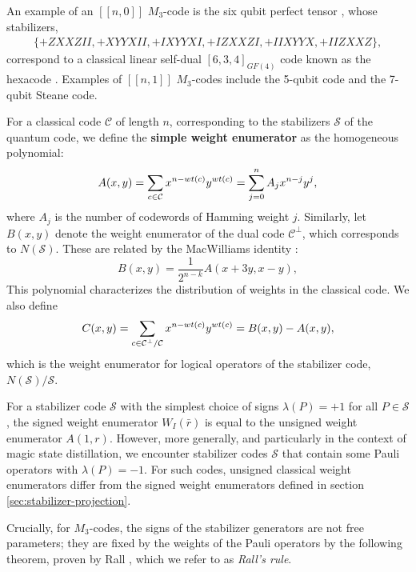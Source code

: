 \documentclass[11pt]{article}
\newcommand{\wt}{{\rm{wt}} }
\begin{document}
An example of an $[[n,0]]$ $M_3$-code is the six qubit perfect tensor \cite{pastawski2015holographic}, whose stabilizers, 
\begin{equation}
    \begin{split}
     \{   +ZXXZII, +XYYXII,  +IXYYXI,  +IZXXZI, +IIXYYX, +IIZXXZ\},
    \end{split}
\end{equation}
correspond to a classical linear self-dual $[6,3,4] _{GF(4)}$ code known as the hexacode \cite{macwilliams1978self}. Examples of $[[n,1]]$ $M_3$-codes include the 5-qubit code and the 7-qubit Steane code.

For a classical code $\mathcal{C}$ of length $n$, corresponding to the stabilizers $\mathcal{S}$ of the quantum code, we define the \textbf{simple weight enumerator} \cite{MacWilliamsSloane5} as the homogeneous polynomial:
\begin{equation}
    A(x,y) = \sum_{c \in \mathcal{C}} x^{n-\wt(c)} y^{\wt(c)} = \sum_{j=0}^n A_j x^{n-j} y^j,
\end{equation}
where $A_j$ is the number of codewords of Hamming weight $j$. Similarly, let $B(x,y)$ denote the weight enumerator of the dual code $\mathcal{C}^\perp$, which corresponds to $N(\mathcal S)$.
These are related by the MacWilliams identity \cite{MacWilliamsSloane5}:
\begin{equation}
    B(x,y) = \frac{1}{2^{n-k}} A(x+3y, x-y), \label{eq:classical-macwilliams}
\end{equation}
This polynomial characterizes the distribution of weights in the classical code. We also define
\begin{equation}
    C(x,y)= \sum_{c \in \mathcal C^\perp/\mathcal C} x^{n- \wt(c)}y^{\wt(c)} =B(x,y)-A(x,y) ,
\end{equation}
which is the weight enumerator for logical operators of the stabilizer code, $N(\mathcal S)/\mathcal S$.

For a stabilizer code $\mathcal S$ with the simplest choice of signs $\lambda(P)=+1$ for all $P \in \mathcal S$, the signed weight enumerator $W_I(\bar{r})$ is equal to the unsigned weight enumerator $A(1,r)$. However, more generally, and particularly in the context of magic state distillation, we encounter stabilizer codes $\mathcal S$ that contain some Pauli operators with $\lambda(P)=-1$. For such codes, unsigned classical weight enumerators differ from the signed weight enumerators defined in section \ref{sec:stabilizer-projection}.

Crucially, for $M_3$-codes, the signs of the stabilizer generators are not free parameters; they are fixed by the weights of the Pauli operators by the following theorem, proven by Rall \cite{rall2017signed}, which we refer to as \textit{Rall's rule}.
\end{document}
